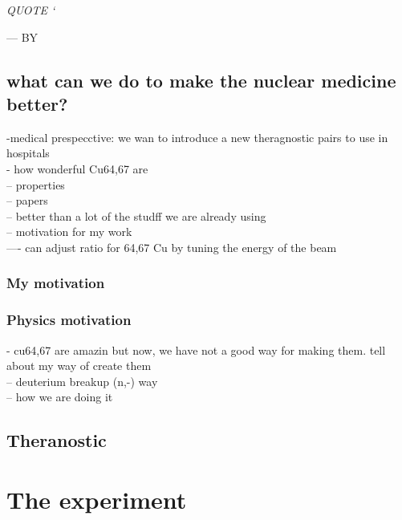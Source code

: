 \documentclass[twoside,english]{uiofysmaster/uiofysmaster}
\begin{document}
\epigraph{\itshape QUOTE `}{--- \textup{BY}}


\section{what can we do to make the nuclear medicine better?}
\label{sec: betterwork}

-medical prespecctive: we wan to introduce a new theragnostic pairs to use in hospitals\\
- how wonderful Cu64,67 are\\
-- properties\\
-- papers\\
-- better than a lot of the studff we are already using\\
-- motivation for my work\\
---- can adjust ratio for 64,67 Cu by tuning the energy of the beam\\



\subsection{My motivation}
\label{sec: my_motivation}




\subsection{Physics motivation}
\label{sec: physics_motivation}

- cu64,67 are amazin but now, we have not a good way for making them. tell about my way of create them\\
-- deuterium breakup (n,-) way\\
-- how we are doing it\\


\section{Theranostic}
\label{sec:theranostic}


\chapter{The experiment}
\label{ch: experiment}
\end{document}
